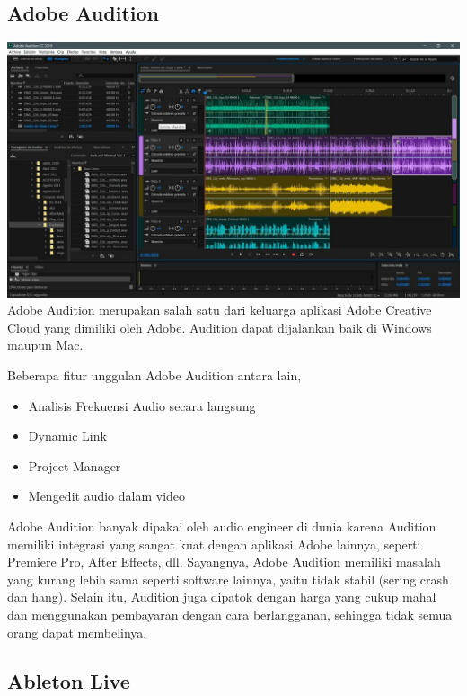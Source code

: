 \documentclass[12pt,a4paper]{report}
\begin{document}
  \subsection*{Adobe Audition}\label{adobe-audition}

  \includegraphics[width=\textwidth]{images/audition.jpg} Adobe Audition merupakan salah
  satu dari keluarga aplikasi Adobe Creative Cloud yang dimiliki oleh
  Adobe. Audition dapat dijalankan baik di Windows maupun Mac.

  Beberapa fitur unggulan Adobe Audition antara lain,

  \begin{itemize}
  \item
    Analisis Frekuensi Audio secara langsung
  \item
    Dynamic Link
  \item
    Project Manager
  \item
    Mengedit audio dalam video
  \end{itemize}

  Adobe Audition banyak dipakai oleh audio engineer di dunia karena
  Audition memiliki integrasi yang sangat kuat dengan aplikasi Adobe
  lainnya, seperti Premiere Pro, After Effects, dll. Sayangnya, Adobe
  Audition memiliki masalah yang kurang lebih sama seperti software
  lainnya, yaitu tidak stabil (sering crash dan hang). Selain itu,
  Audition juga dipatok dengan harga yang cukup mahal dan menggunakan
  pembayaran dengan cara berlangganan, sehingga tidak semua orang dapat
  membelinya.

  \subsection*{Ableton Live}\label{ableton-live}
\end{document}
